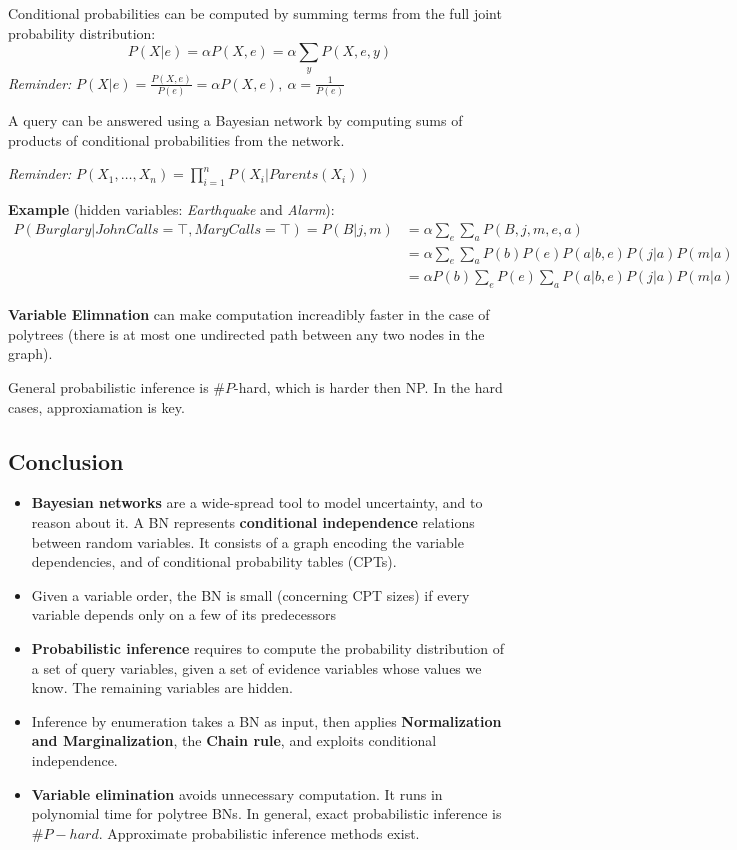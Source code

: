 \documentclass{scrartcl}
\begin{document}
\bigbreak

Conditional probabilities can be computed by summing terms from the full joint probability distribution:
\[P(X|e) = \alpha P(X, e) = \alpha \sum_y P(X, e, y)\]
\textit{Reminder:} \(P(X|e) = \frac{P(X,e)}{P(e)} = \alpha P(X,e),\ \alpha = \frac{1}{P(e)}\)

A query can be answered using a Bayesian network by computing sums of products of conditional probabilities from the network.

\textit{Reminder:} \(P(X_1, \dots, X_n) = \prod_{i=1}^n P(X_i | Parents(X_i))\)

\bigbreak

\textbf{Example} (hidden variables: \textit{Earthquake} and \textit{Alarm}):
\begin{align*}
    P(Burglary | JohnCalls = \top, MaryCalls = \top) = P(B | j, m) &= \alpha \sum_e \sum_a P(B, j, m, e, a) \\
    &= \alpha \sum_e \sum_a P(b) P(e) P(a|b,e) P(j|a) P(m|a)\\
    &= \alpha P(b) \sum_e P(e) \sum_a  P(a|b,e) P(j|a) P(m|a)
\end{align*}


\textbf{Variable Elimnation} can make computation increadibly faster in the case of polytrees (there is at most one undirected path between any two nodes in the graph).

General probabilistic inference is \(\#P\)-hard, which is harder then NP. In the hard cases, approxiamation is key.

\subsection{Conclusion}
\begin{itemize}
    \item
        \textbf{Bayesian networks} are a wide-spread tool to model uncertainty, and to reason about it. A BN represents \textbf{conditional independence} relations between random variables. It consists of a graph encoding the variable dependencies, and of conditional probability tables (CPTs).
    \item
        Given a variable order, the BN is small (concerning CPT sizes) if every variable depends only on a few of its predecessors
    \item
        \textbf{Probabilistic inference} requires to compute the probability distribution of a set of query variables, given a set of evidence variables whose values we know. The remaining variables are hidden. 
    \item
        Inference by enumeration takes a BN as input, then applies \textbf{Normalization and Marginalization}, the \textbf{Chain rule}, and exploits conditional independence.
    \item
        \textbf{Variable elimination} avoids unnecessary computation. It runs in polynomial time for polytree BNs. In general, exact probabilistic inference is \(\#P-hard\). Approximate probabilistic inference methods exist.
\end{itemize}
\end{document}
